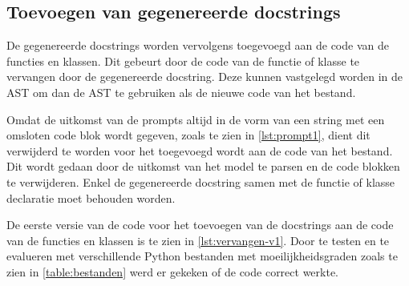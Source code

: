 \subsection{Toevoegen van gegenereerde docstrings}
\label{sec:bestanddocumentatie-vervangen}
De gegenereerde docstrings worden vervolgens toegevoegd aan de code van de functies en klassen.
Dit gebeurt door de code van de functie of klasse te vervangen door de gegenereerde docstring.
Deze kunnen vastgelegd worden in de AST om dan de AST te gebruiken als de nieuwe code van het bestand.

Omdat de uitkomst van de prompts altijd in de vorm van een string met een omsloten code blok wordt gegeven, zoals te zien in \ref{lst:prompt1}, dient dit verwijderd te worden voor het toegevoegd wordt aan de code van het bestand. 
Dit wordt gedaan door de uitkomst van het model te parsen en de code blokken te verwijderen.
Enkel de gegenereerde docstring samen met de functie of klasse declaratie moet behouden worden.

De eerste versie van de code voor het toevoegen van de docstrings aan de code van de functies en klassen is te zien in \ref{lst:vervangen-v1}.
Door te testen en te evalueren met verschillende Python bestanden met moeilijkheidsgraden zoals te zien in \ref{table:bestanden} werd er gekeken of de code correct werkte.

\begin{table}[h!]
    \centering
    \caption{Aantal functies en klassen in de verschillende Python bestanden.}
    \label{table:bestanden}
\end{table}

